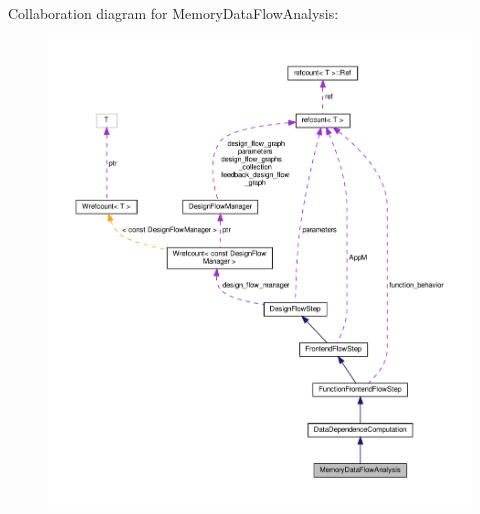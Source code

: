 Collaboration diagram for Memory\+Data\+Flow\+Analysis\+:
\nopagebreak
\begin{figure}[H]
\begin{center}
\leavevmode
\includegraphics[width=350pt]{d9/d02/classMemoryDataFlowAnalysis__coll__graph}
\end{center}
\end{figure}
